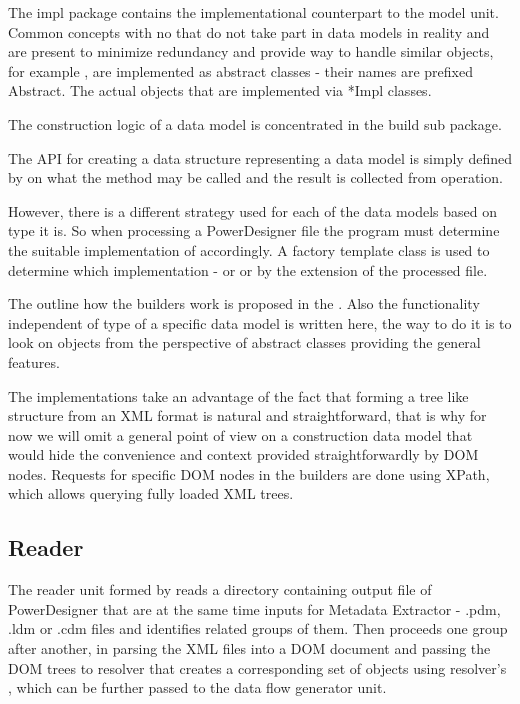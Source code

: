 The impl package contains the implementational counterpart to the model unit.
Common concepts with no that do not take part in data models in reality and are present to minimize redundancy and provide way to handle similar objects, for example , are implemented as abstract classes - their names are prefixed Abstract. The actual objects that are implemented via *Impl classes.

The construction logic of a data model is concentrated in the build sub package.

The API for creating a data structure representing a data model is simply defined by  on what the method  may be called and the result is collected from  operation.

However, there is a different strategy used for each of the data models based on type it is. So when processing a PowerDesigner file the program must determine the suitable implementation of  accordingly. 
A factory template class  is used to determine which implementation -  or  or  by the extension of the processed file.

The outline how the builders work is proposed in the . Also the functionality independent of type of a specific data model is written here, the way to do it is to look on objects from the perspective of abstract classes providing the general features.

The implementations take an advantage of the fact that forming a tree like structure from an XML format is natural and straightforward, that is why for now we will omit a general point of view on a construction data model that would hide the convenience and context provided straightforwardly by DOM nodes. 
Requests for specific DOM nodes in the builders are done using XPath, which allows querying fully loaded XML trees.

\subsection{Reader}

The reader unit formed by  reads a directory containing output file of PowerDesigner that are at the same time inputs for Metadata Extractor - .pdm, .ldm or .cdm files and identifies related groups of them. Then proceeds one group after another, in parsing the XML files into a DOM document and passing the DOM trees to resolver that creates a corresponding set of  objects using resolver's , which can be further passed to the data flow generator unit.
 
